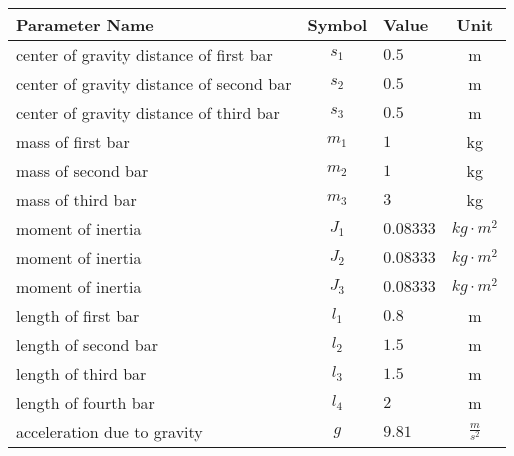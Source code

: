 \begin{tabular}{lclc}
\hline
 Parameter Name                           &  Symbol  & Value     &      Unit       \\
\hline
 center of gravity distance of first bar  & $s_{1}$  & $0.5$     &        m        \\
 center of gravity distance of second bar & $s_{2}$  & $0.5$     &        m        \\
 center of gravity distance of third bar  & $s_{3}$  & $0.5$     &        m        \\
 mass of first bar                        & $m_{1}$  & $1$       &       kg        \\
 mass of second bar                       & $m_{2}$  & $1$       &       kg        \\
 mass of third bar                        & $m_{3}$  & $3$       &       kg        \\
 moment of inertia                        & $J_{1}$  & $0.08333$ & $kg \cdot m^2$  \\
 moment of inertia                        & $J_{2}$  & $0.08333$ & $kg \cdot m^2$  \\
 moment of inertia                        & $J_{3}$  & $0.08333$ & $kg \cdot m^2$  \\
 length of first bar                      & $l_{1}$  & $0.8$     &        m        \\
 length of second bar                     & $l_{2}$  & $1.5$     &        m        \\
 length of third bar                      & $l_{3}$  & $1.5$     &        m        \\
 length of fourth bar                     & $l_{4}$  & $2$       &        m        \\
 acceleration due to gravity              &   $g$    & $9.81$    & $\frac{m}{s^2}$ \\
\hline
\end{tabular}